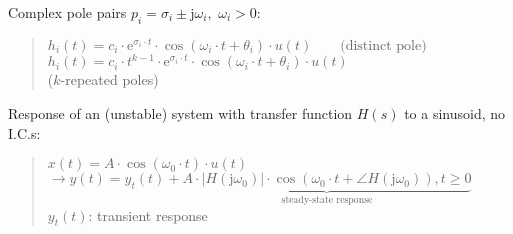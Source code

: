 \documentclass[fontsize=9pt,a4paper,twocolumn]{scrartcl}
\begin{document}
Complex pole pairs $p_i=\sigma_i\pm\mathrm{j}\omega_i, \,\,\omega_i>0$:
\begin{quote}
	$h_i(t)=c_i\cdot\mathrm{e}^{\sigma_i\cdot t}\cdot\cos(\omega_i\cdot t+\theta_i)\cdot u(t)\qquad\text{(distinct pole)}$\\
	$h_i(t)=c_i\cdot t^{k-1}\cdot\mathrm{e}^{\sigma_i\cdot t}\cdot\cos(\omega_i\cdot t+\theta_i)\cdot u(t)$\\
	\hspace*{1cm}($k$-repeated poles)
\end{quote}

Response of an (unstable) system with transfer function $H(s)$ to a sinusoid, no I.C.s:
\begin{quote}
	$x(t)=A\cdot\cos(\omega_0\cdot t)\cdot u(t)$\\
	$\to y(t)=y_t(t)+\underbrace{A\cdot\left|H(\mathrm{j}\omega_0)\right|\cdot\cos\left(\omega_0\cdot t+\angle H(\mathrm{j}\omega_0)\right), t\geq 0}_\text{steady-state response}$\\
	$y_t(t)$: transient response
\end{quote}
\end{document}
